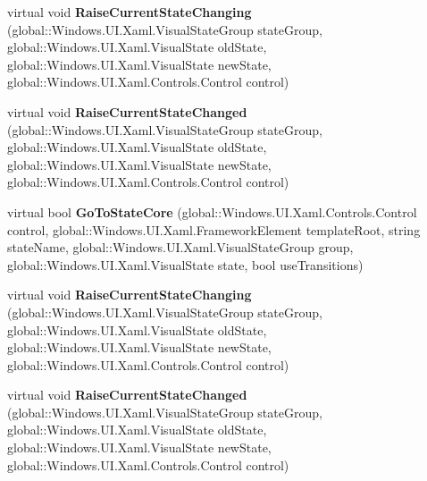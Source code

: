 \begin{DoxyCompactItemize}
\item 
\mbox{\label{class_windows_1_1_u_i_1_1_xaml_1_1_visual_state_manager_a50a0e31984a4bf6d06bb7e56db64a21f}} 
virtual void {\bfseries Raise\+Current\+State\+Changing} (global\+::\+Windows.\+U\+I.\+Xaml.\+Visual\+State\+Group state\+Group, global\+::\+Windows.\+U\+I.\+Xaml.\+Visual\+State old\+State, global\+::\+Windows.\+U\+I.\+Xaml.\+Visual\+State new\+State, global\+::\+Windows.\+U\+I.\+Xaml.\+Controls.\+Control control)
\item 
\mbox{\label{class_windows_1_1_u_i_1_1_xaml_1_1_visual_state_manager_a64847abd05cfc83d3fd14ec421fe7261}} 
virtual void {\bfseries Raise\+Current\+State\+Changed} (global\+::\+Windows.\+U\+I.\+Xaml.\+Visual\+State\+Group state\+Group, global\+::\+Windows.\+U\+I.\+Xaml.\+Visual\+State old\+State, global\+::\+Windows.\+U\+I.\+Xaml.\+Visual\+State new\+State, global\+::\+Windows.\+U\+I.\+Xaml.\+Controls.\+Control control)
\item 
\mbox{\label{class_windows_1_1_u_i_1_1_xaml_1_1_visual_state_manager_a8c0de7e6b9bdb57e46befcf69225644e}} 
virtual bool {\bfseries Go\+To\+State\+Core} (global\+::\+Windows.\+U\+I.\+Xaml.\+Controls.\+Control control, global\+::\+Windows.\+U\+I.\+Xaml.\+Framework\+Element template\+Root, string state\+Name, global\+::\+Windows.\+U\+I.\+Xaml.\+Visual\+State\+Group group, global\+::\+Windows.\+U\+I.\+Xaml.\+Visual\+State state, bool use\+Transitions)
\item 
\mbox{\label{class_windows_1_1_u_i_1_1_xaml_1_1_visual_state_manager_a50a0e31984a4bf6d06bb7e56db64a21f}} 
virtual void {\bfseries Raise\+Current\+State\+Changing} (global\+::\+Windows.\+U\+I.\+Xaml.\+Visual\+State\+Group state\+Group, global\+::\+Windows.\+U\+I.\+Xaml.\+Visual\+State old\+State, global\+::\+Windows.\+U\+I.\+Xaml.\+Visual\+State new\+State, global\+::\+Windows.\+U\+I.\+Xaml.\+Controls.\+Control control)
\item 
\mbox{\label{class_windows_1_1_u_i_1_1_xaml_1_1_visual_state_manager_a64847abd05cfc83d3fd14ec421fe7261}} 
virtual void {\bfseries Raise\+Current\+State\+Changed} (global\+::\+Windows.\+U\+I.\+Xaml.\+Visual\+State\+Group state\+Group, global\+::\+Windows.\+U\+I.\+Xaml.\+Visual\+State old\+State, global\+::\+Windows.\+U\+I.\+Xaml.\+Visual\+State new\+State, global\+::\+Windows.\+U\+I.\+Xaml.\+Controls.\+Control control)

\end{DoxyCompactItemize}
